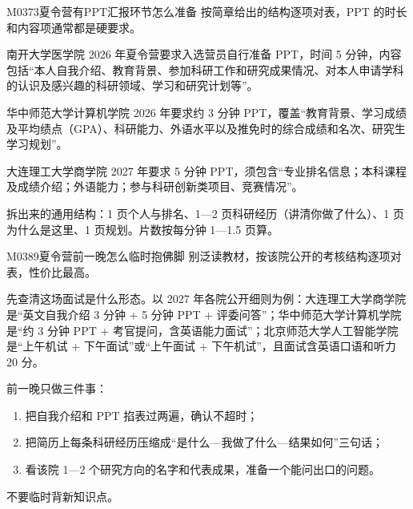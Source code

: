 \begin{qa}{M0373}{夏令营有PPT汇报环节怎么准备}
按简章给出的结构逐项对表，PPT 的时长和内容项通常都是硬要求。

南开大学医学院 2026 年夏令营要求入选营员自行准备 PPT，时间 5 分钟，内容包括“本人自我介绍、教育背景、参加科研工作和研究成果情况、对本人申请学科的认识及感兴趣的科研领域、学习和研究计划等”。

华中师范大学计算机学院 2026 年要求约 3 分钟 PPT，覆盖“教育背景、学习成绩及平均绩点（GPA）、科研能力、外语水平以及推免时的综合成绩和名次、研究生学习规划”。

大连理工大学商学院 2027 年要求 5 分钟 PPT，须包含“专业排名信息；本科课程及成绩介绍；外语能力；参与科研创新类项目、竞赛情况”。

拆出来的通用结构：1 页个人与排名、1—2 页科研经历（讲清你做了什么）、1 页为什么是这里、1 页规划。片数按每分钟 1—1.5 页算。
\end{qa}

\begin{qa}{M0389}{夏令营前一晚怎么临时抱佛脚}
别泛读教材，按该院公开的考核结构逐项对表，性价比最高。

先查清这场面试是什么形态。以 2027 年各院公开细则为例：大连理工大学商学院是“英文自我介绍 3 分钟 + 5 分钟 PPT + 评委问答”；华中师范大学计算机学院是“约 3 分钟 PPT + 考官提问，含英语能力面试”；北京师范大学人工智能学院是“上午机试 + 下午面试”或“上午面试 + 下午机试”，且面试含英语口语和听力 20 分。

前一晚只做三件事：
\begin{enumerate}
  \item 把自我介绍和 PPT 掐表过两遍，确认不超时；
  \item 把简历上每条科研经历压缩成“是什么—我做了什么—结果如何”三句话；
  \item 看该院 1—2 个研究方向的名字和代表成果，准备一个能问出口的问题。
\end{enumerate}

不要临时背新知识点。
\end{qa}

